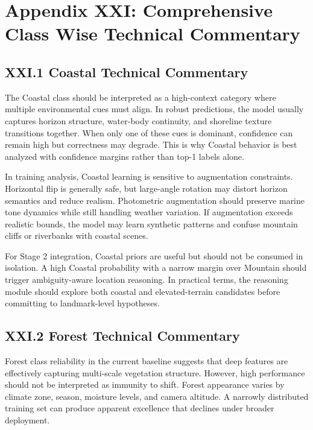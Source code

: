 \section*{Appendix XXI: Comprehensive Class Wise Technical Commentary}

\subsection*{XXI.1 Coastal Technical Commentary}
The Coastal class should be interpreted as a high-context category where multiple environmental cues must align. In robust predictions, the model usually captures horizon structure, water-body continuity, and shoreline texture transitions together. When only one of these cues is dominant, confidence can remain high but correctness may degrade. This is why Coastal behavior is best analyzed with confidence margins rather than top-1 labels alone.

In training analysis, Coastal learning is sensitive to augmentation constraints. Horizontal flip is generally safe, but large-angle rotation may distort horizon semantics and reduce realism. Photometric augmentation should preserve marine tone dynamics while still handling weather variation. If augmentation exceeds realistic bounds, the model may learn synthetic patterns and confuse mountain cliffs or riverbanks with coastal scenes.

For Stage 2 integration, Coastal priors are useful but should not be consumed in isolation. A high Coastal probability with a narrow margin over Mountain should trigger ambiguity-aware location reasoning. In practical terms, the reasoning module should explore both coastal and elevated-terrain candidates before committing to landmark-level hypotheses.

\subsection*{XXI.2 Forest Technical Commentary}
Forest class reliability in the current baseline suggests that deep features are effectively capturing multi-scale vegetation structure. However, high performance should not be interpreted as immunity to shift. Forest appearance varies by climate zone, season, moisture levels, and camera altitude. A narrowly distributed training set can produce apparent excellence that declines under broader deployment.

